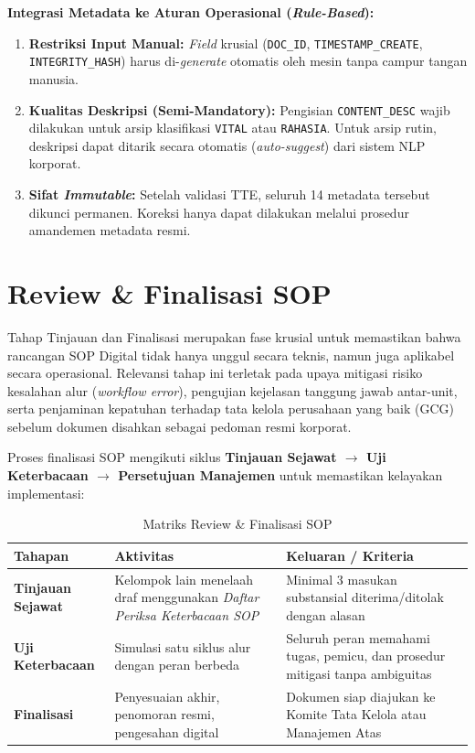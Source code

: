 \documentclass[12pt,a4paper]{report}
\begin{document}
\begin{plnbox}
\textbf{Integrasi Metadata ke Aturan Operasional (\textit{Rule-Based}):}
\begin{enumerate}[leftmargin=*]
    \item \textbf{Restriksi Input Manual:} \textit{Field} krusial (\texttt{DOC\_ID}, \texttt{TIMESTAMP\_CREATE}, \texttt{INTEGRITY\_HASH}) harus di-\textit{generate} otomatis oleh mesin tanpa campur tangan manusia.
    \item \textbf{Kualitas Deskripsi (Semi-Mandatory):} Pengisian \texttt{CONTENT\_DESC} wajib dilakukan untuk arsip klasifikasi \texttt{VITAL} atau \texttt{RAHASIA}. Untuk arsip rutin, deskripsi dapat ditarik secara otomatis (\textit{auto-suggest}) dari sistem NLP korporat.
    \item \textbf{Sifat \textit{Immutable}:} Setelah validasi TTE, seluruh 14 metadata tersebut dikunci permanen. Koreksi hanya dapat dilakukan melalui prosedur amandemen metadata resmi.
\end{enumerate}
\end{plnbox}

\section{Review \& Finalisasi SOP}
Tahap Tinjauan dan Finalisasi merupakan fase krusial untuk memastikan bahwa rancangan SOP Digital tidak hanya unggul secara teknis, namun juga aplikabel secara operasional. Relevansi tahap ini terletak pada upaya mitigasi risiko kesalahan alur (\textit{workflow error}), pengujian kejelasan tanggung jawab antar-unit, serta penjaminan kepatuhan terhadap tata kelola perusahaan yang baik (GCG) sebelum dokumen disahkan sebagai pedoman resmi korporat.

Proses finalisasi SOP mengikuti siklus \textbf{Tinjauan Sejawat $\rightarrow$ Uji Keterbacaan $\rightarrow$ Persetujuan Manajemen} untuk memastikan kelayakan implementasi:

\begin{table}[htbp]
\centering
\small
\caption{Matriks Review \& Finalisasi SOP}
\begin{tabularx}{\textwidth}{@{} >{\raggedright\arraybackslash}X >{\raggedright\arraybackslash}X >{\raggedright\arraybackslash}X @{}}
\toprule
\textbf{Tahapan} & \textbf{Aktivitas} & \textbf{Keluaran / Kriteria} \\
\midrule
\textbf{Tinjauan Sejawat} & Kelompok lain menelaah draf menggunakan \textit{Daftar Periksa Keterbacaan SOP} & Minimal 3 masukan substansial diterima/ditolak dengan alasan \\
\textbf{Uji Keterbacaan} & Simulasi satu siklus alur dengan peran berbeda & Seluruh peran memahami tugas, pemicu, dan prosedur mitigasi tanpa ambiguitas \\
\textbf{Finalisasi} & Penyesuaian akhir, penomoran resmi, pengesahan digital & Dokumen siap diajukan ke Komite Tata Kelola atau Manajemen Atas \\
\bottomrule
\end{tabularx}
\end{table}
\end{document}
